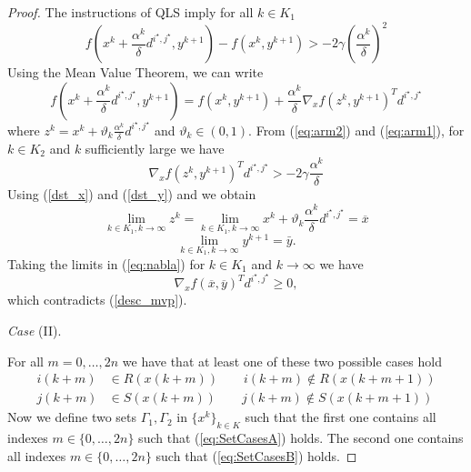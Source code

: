 \begin{proof}
The instructions of QLS imply for all $k\in K_1$
\begin{equation}\label{eq:arm1}
f(x^k + \frac{\alpha^k}{\delta} d^{i^\star,j^\star}, y^{k+1}) - f(x^k,y^{k+1}) > -2\gamma \left(\frac{\alpha^k}{\delta}\right)^2 
\end{equation}
Using the Mean Value Theorem, we can write
\begin{equation}\label{eq:arm2}
f(x^k + \frac{\alpha^k}{\delta} d^{i^\star,j^\star}, y^{k+1}) = f(x^k, y^{k+1}) + \frac{\alpha^k}{\delta} \nabla_x f(z^k, y^{k+1})^T d^{i^\star,j^\star}
\end{equation}
where $z^k = x^k + \vartheta_k \frac{\alpha^k}{\delta} d^{i^\star,j^\star}$ and $\vartheta_k \in (0,1)$. 
From (\ref{eq:arm2}) and (\ref{eq:arm1}), for $k\in K_2$ and $k$ sufficiently large we have
\begin{equation}\label{eq:nabla}
\nabla_x f(z^k, y^{k+1})^T d^{i^\star,j^\star}  >- 2\gamma \frac{\alpha^k}{\delta} 
\end{equation}
Using (\ref{dst_x}) and (\ref{dst_y}) and we obtain
$$
\lim_{k \in K_1, k \rightarrow \infty} z^k = \lim_{k \in K_1, k \rightarrow \infty} x^k + \vartheta_k \frac{\alpha^k}{\delta} d^{i^\star,j^\star} = \overline{x}
$$
$$
\lim_{k\in K_1,k\to\infty}y^{k+1}=\bar y.
$$
Taking the limits in (\ref{eq:nabla}) for $k\in K_1$ and $k\to\infty$ we have
\begin{equation}\label{ddirmg0}
\nabla_x f(\overline{x},\overline{y})^T d^{i^\star,j^\star} \geq 0,
\end{equation}
which contradicts (\ref{desc_mvp}).
\par\bigskip\noindent
{\it Case} (II).
\par\medskip\noindent
For all $m=0,\ldots ,2n$ we have that at least one of these two possible cases hold
 \begin{subequations}
\begin{align}
 i(k+m)&\in R(x(k+m))\quad \quad i(k+m)\notin R(x(k+m+1))\label{eq:SetCasesA}\\
 j(k+m)&\in S(x(k+m))\quad \quad j(k+m)\notin S(x(k+m+1))\label{eq:SetCasesB}
\end{align}
\end{subequations}
Now we define two sets $\Gamma_1,\Gamma_2$ in $\{x^{k}\}_{k \in K}$ such that the first one contains all indexes $m \in\{0,\ldots,2n\}$ such that 
(\ref{eq:SetCasesA}) holds.
The second one contains all indexes $m \in\{0,\ldots,2n\}$ such that (\ref{eq:SetCasesB}) holds.


\end{proof}
